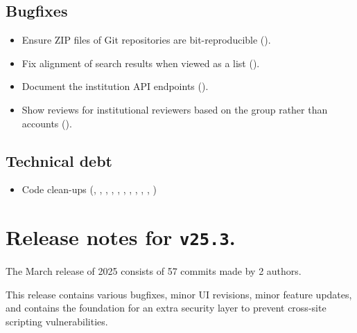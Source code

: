 \subsection*{Bugfixes}
\begin{itemize}
\item{Ensure ZIP files of Git repositories are bit-reproducible
    ().}
\item{Fix alignment of search results when viewed as a list
    ().}
\item{Document the institution API endpoints
    ().}
\item{Show reviews for institutional reviewers based on the group rather
    than accounts ().}
\end{itemize}

\subsection*{Technical debt}
\begin{itemize}
\item{Code clean-ups (,
    ,
    ,
    ,
    ,
    ,
    ,
    ,
    ,
    ,
    )}
\end{itemize}

\section*{Release notes for \texttt{v25.3}.}

  The March release of 2025 consists of 57 commits made by 2 authors.

  This release contains various bugfixes, minor UI revisions, minor feature
  updates, and contains the foundation for an extra security layer to prevent
  cross-site scripting vulnerabilities.

